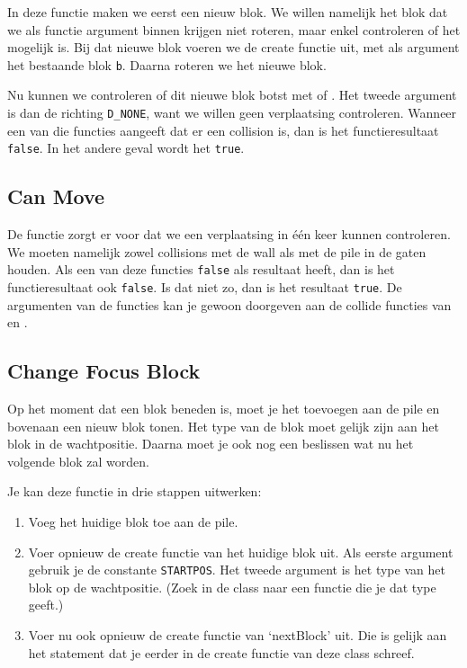 In deze functie maken we eerst een nieuw blok. We willen namelijk het blok dat we als functie argument binnen krijgen niet roteren, maar enkel controleren of het mogelijk is. Bij dat nieuwe blok voeren we de create functie uit, met als argument het bestaande blok \verb|b|. Daarna roteren we het nieuwe blok.

Nu kunnen we controleren of dit nieuwe blok botst met  of . Het tweede argument is dan de richting \verb|D_NONE|, want we willen geen verplaatsing controleren. Wanneer een van die functies aangeeft dat er een collision is, dan is het functieresultaat \verb|false|. In het andere geval wordt het \verb|true|.

\subsection{Can Move}
De functie  zorgt er voor dat we een verplaatsing in \'e\'en keer kunnen controleren. We moeten namelijk zowel collisions met de wall als met de pile in de gaten houden. Als een van deze functies \verb|false| als resultaat heeft, dan is het functieresultaat ook \verb|false|. Is dat niet zo, dan is het resultaat \verb|true|. De argumenten van de functies kan je gewoon doorgeven aan de collide functies van  en .

\subsection{Change Focus Block}
Op het moment dat een blok beneden is, moet je het toevoegen aan de pile en bovenaan een nieuw blok tonen. Het type van de blok moet gelijk zijn aan het blok in de wachtpositie. Daarna moet je ook nog een beslissen wat nu het volgende blok zal worden.

Je kan deze functie in drie stappen uitwerken:

\begin{enumerate}
	\item Voeg het huidige blok toe aan de pile.
	\item Voer opnieuw de create functie van het huidige blok uit. Als eerste argument gebruik je de constante \verb|STARTPOS|. Het tweede argument is het type van het blok op de wachtpositie. (Zoek in de class  naar een functie die je dat type geeft.)
	\item Voer nu ook opnieuw de create functie van `nextBlock' uit. Die is gelijk aan het statement dat je eerder in de create functie van deze class schreef.
\end{enumerate}

